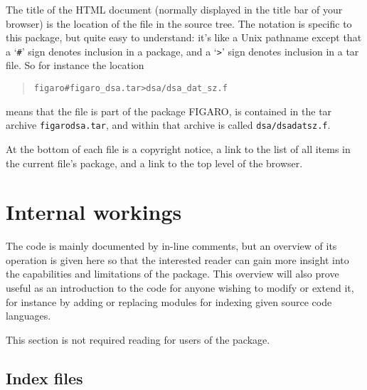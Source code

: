 \documentclass[twoside,11pt]{article}
\newcommand{\xlabel}[1]{}
\renewcommand{\_}{\texttt{\symbol{95}}}
\begin{document}
The title of the HTML document
(normally displayed in the title bar of your browser)
is the location of the file in
the source tree.  The notation is specific to this package,
but quite easy to understand:
it's like a Unix pathname except that
a `{\tt \#}' sign denotes inclusion in a package,
and a
`\verb|>|'
sign denotes inclusion in a tar file.
So for instance the location
\begin{quote}
\begin{verbatim}
figaro#figaro_dsa.tar>dsa/dsa_dat_sz.f
\end{verbatim}
\end{quote}
means that the file is part of the package FIGARO,
is contained in the tar archive {\tt figaro\_dsa.tar}, and
within that archive is called {\tt dsa/dsa\_dat\_sz.f}.

At the bottom of each file is a copyright notice,
a link to the list of all items in the current file's package,
and a link to the top level of the browser.


\section{\xlabel{sec:internals}\label{sec:internals}Internal workings}

The code is mainly documented by in-line comments,
but an overview of its operation is given here so
that the interested reader can gain more insight into
the capabilities and limitations of the package.
This overview will also prove useful as an introduction to
the code for anyone wishing to modify or extend it,
for instance by adding or replacing modules for indexing
given source code languages.

This section is not required reading for users of the package.

\subsection{\xlabel{sec:internals-indexes}\label{sec:internals-indexes}Index files}
\end{document}
